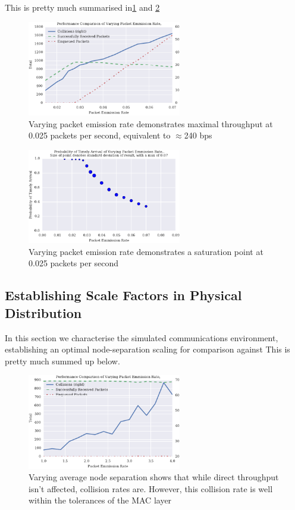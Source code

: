 \documentclass[runningheads,a4paper]{llncs}
\begin{document}
This is pretty much summarised in\ref{fig:throughput_performance_static} and \ref{fig:prod_breakdown} 

\begin{figure}[h]
  \centering
  \includegraphics[width=0.6\textwidth]{img/throughput_performance_static.pdf}
  \caption{Varying packet emission rate demonstrates maximal throughput at 0.025 packets per second, equivalent to $\approx$240 bps}
  \label{fig:throughput_performance_static}
\end{figure}


\begin{figure}[h]
  \centering
  \includegraphics[width=0.6\textwidth]{img/prod_breakdown_static.pdf}
  \caption{Varying packet emission rate demonstrates a saturation point at 0.025 packets per second}
  \label{fig:prod_breakdown}
\end{figure}


\subsection{Establishing Scale Factors in Physical Distribution}

In this section we characterise the simulated communications environment, establishing an optimal node-separation scaling for comparison against \cite{Guo11}
This is pretty much summed up below.
\begin{figure}[h]
  \centering
  \includegraphics[width=0.6\textwidth]{img/throughput_performance_range.pdf}
  \caption{Varying average node separation shows that while direct throughput isn't affected, collision rates are. However, this collision rate is well within the tolerances of the MAC layer}
  \label{fig:throughput_performance}
\end{figure}
\end{document}
